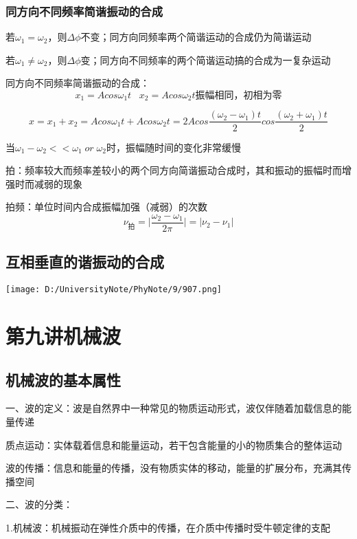 \documentclass[UTF8]{article}
\begin{document}
\subsubsection{同方向不同频率简谐振动的合成}

    若$\omega_1 = \omega_2$，则$\Delta \phi$不变；同方向同频率两个简谐运动的合成仍为简谐运动

    若$\omega_1 \neq \omega_2$，则$\Delta \phi$变；同方向不同频率的两个简谐运动搞的合成为一复杂运动

    同方向不同频率简谐振动的合成：
    \[x_1 = Acos\omega_1 t\;\;\;x_2 = Acos\omega_2 t\mbox{振幅相同，初相为零}\]

    \[x = x_1 + x_2 = Acos\omega_1 t + Acos\omega_2 t = 2Acos\frac{(\omega_2 - \omega_1)t}{2}cos\frac{(\omega_2 + \omega_1)t}{2}\]

    当$\omega_1 - \omega_2<<\omega_1\; or \;\omega_2$时，振幅随时间的变化非常缓慢

    拍：频率较大而频率差较小的两个同方向简谐振动合成时，其和振动的振幅时而增强时而减弱的现象

    拍频：单位时间内合成振幅加强（减弱）的次数
    \[\nu_{\mbox{拍}} = \vert \frac{\omega_2 - \omega_1}{2\pi} \lvert = \vert \nu_2 - \nu_1 \lvert\]

\subsection{互相垂直的谐振动的合成}

    \texttt{[image: D:/UniversityNote/PhyNote/9/907.png]}

\newpage
\section{第九讲\;\;机械波}
\subsection{机械波的基本属性}

    一、波的定义：波是自然界中一种常见的物质运动形式，波仅伴随着加载信息的能量传递

    质点运动：实体载着信息和能量运动，若干包含能量的小的物质集合的整体运动

    波的传播：信息和能量的传播，没有物质实体的移动，能量的扩展分布，充满其传播空间

    二、波的分类：

    1.机械波：机械振动在弹性介质中的传播，在介质中传播时受牛顿定律的支配
\end{document}
